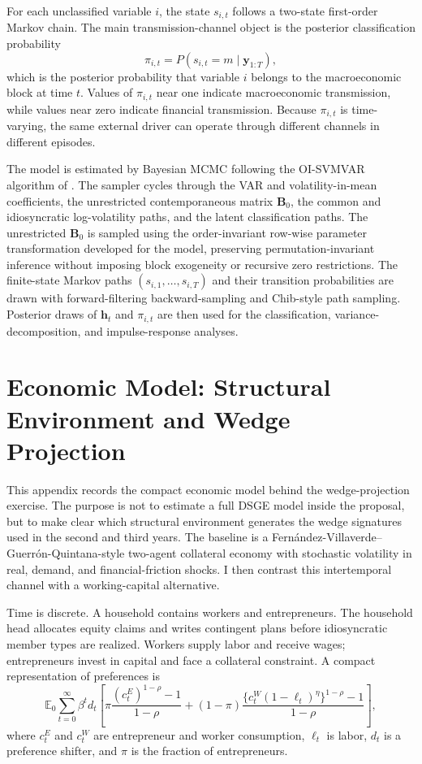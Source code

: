 \documentclass[12pt]{article}
\newcommand{\E}{\mathbb{E}}
\begin{document}
For each unclassified variable $i$, the state $s_{i,t}$ follows a two-state first-order Markov chain.
The main transmission-channel object is the posterior classification probability
\begin{equation}
\pi_{i,t}
=P(s_{i,t}=m\mid \mathbf{y}_{1:T}),
\label{app:pi}
\end{equation}
which is the posterior probability that variable $i$ belongs to the macroeconomic block at time
$t$. Values of $\pi_{i,t}$ near one indicate macroeconomic transmission, while values near zero
indicate financial transmission. Because $\pi_{i,t}$ is time-varying, the same external driver can
operate through different channels in different episodes.

The model is estimated by Bayesian MCMC following the OI-SVMVAR algorithm of
\citet{davidson2025investigating}. The sampler cycles through the VAR and volatility-in-mean
coefficients, the unrestricted contemporaneous matrix $\mathbf{B}_0$, the common and
idiosyncratic log-volatility paths, and the latent classification paths. The unrestricted
$\mathbf{B}_0$ is sampled using the order-invariant row-wise parameter transformation developed
for the model, preserving permutation-invariant inference without imposing block exogeneity or
recursive zero restrictions. The finite-state Markov paths $(s_{i,1},\ldots,s_{i,T})$ and their
transition probabilities are drawn with forward-filtering backward-sampling and Chib-style path
sampling. Posterior draws of $\mathbf{h}_t$ and $\pi_{i,t}$ are then used for the classification,
variance-decomposition, and impulse-response analyses.

\section{Economic Model: Structural Environment and Wedge Projection}
\label{app:wedge-projection}

This appendix records the compact economic model behind the wedge-projection exercise. The
purpose is not to estimate a full DSGE model inside the proposal, but to make clear which
structural environment generates the wedge signatures used in the second and third years.
The baseline is a Fern\'andez-Villaverde--Guerr\'on-Quintana-style two-agent collateral economy
with stochastic volatility in real, demand, and financial-friction shocks. I then contrast this
intertemporal channel with a working-capital alternative.

Time is discrete. A household contains workers and entrepreneurs. The household head allocates
equity claims and writes contingent plans before idiosyncratic member types are realized.
Workers supply labor and receive wages; entrepreneurs invest in capital and face a collateral
constraint. A compact representation of preferences is
\begin{equation}
\E_0\sum_{t=0}^{\infty}\beta^t d_t
\left[
\pi \frac{(c^E_t)^{1-\rho}-1}{1-\rho}
+(1-\pi)\frac{\{c^W_t(1-\ell_t)^\eta\}^{1-\rho}-1}{1-\rho}
\right],
\label{app:fvgq-utility}
\end{equation}
where $c^E_t$ and $c^W_t$ are entrepreneur and worker consumption, $\ell_t$ is labor,
$d_t$ is a preference shifter, and $\pi$ is the fraction of entrepreneurs.
\end{document}
